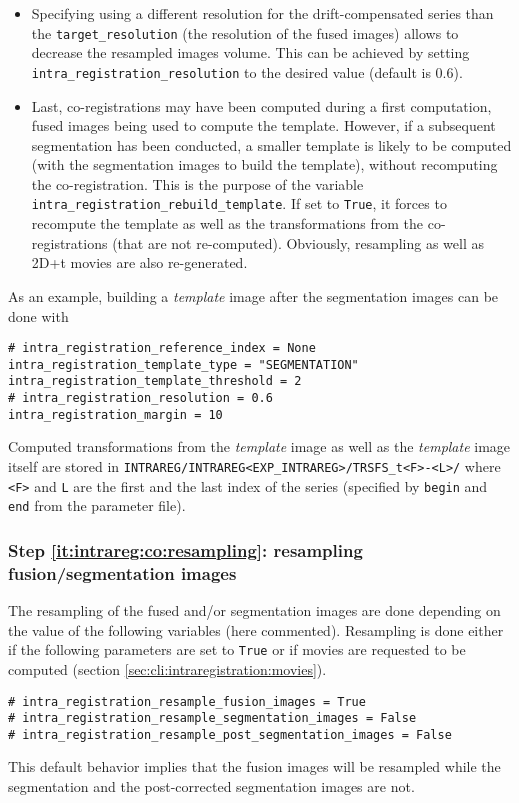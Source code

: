 \begin{itemize}
\item Specifying  using a different resolution for the drift-compensated series than the
\verb|target_resolution| (the resolution of the fused images) allows
to decrease the resampled images volume. This can be achieved by
setting \verb|intra_registration_resolution| to the desired  value  (default is 0.6).

\item 
Last, co-registrations may have been computed during a first
computation, fused images being used to compute the template. However,
if  a subsequent segmentation has been conducted, a smaller template
is likely to be computed (with the segmentation images to build the
template), without recomputing the co-registration. This is the
purpose of the variable
\texttt{intra\_registration\_rebuild\_template}.
If set to \texttt{True}, it forces to recompute the template as well
as the transformations from the co-registrations (that are not
re-computed). Obviously, resampling as well as 2D+t movies are also
re-generated.
\end{itemize}

As an example, building a \textit{template} image after the segmentation images can be done with
\begin{verbatim}
# intra_registration_reference_index = None
intra_registration_template_type = "SEGMENTATION"
intra_registration_template_threshold = 2
# intra_registration_resolution = 0.6
intra_registration_margin = 10
\end{verbatim}


Computed transformations from the \textit{template} image as well as the \textit{template} image itself are stored in \verb|INTRAREG/INTRAREG<EXP_INTRAREG>/TRSFS_t<F>-<L>/| where \verb|<F>| and \verb|L| are the first and the last index of the series (specified by \verb|begin| and \verb|end| from the parameter file).


\subsubsection{Step \ref{it:intrareg:co:resampling}: resampling fusion/segmentation images}
\label{sec:cli:intraregistration:resampling}

The resampling of the fused and/or segmentation images are done
depending on the value of the following variables (here commented). Resampling is done
either if the following parameters are set to \verb|True| or if movies
are requested to be computed (section \ref{sec:cli:intraregistration:movies}).
\begin{verbatim}
# intra_registration_resample_fusion_images = True
# intra_registration_resample_segmentation_images = False
# intra_registration_resample_post_segmentation_images = False
\end{verbatim}
This default behavior implies that the fusion images will be resampled
while the segmentation and the post-corrected segmentation images are not.


